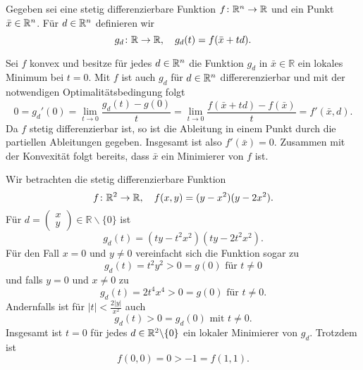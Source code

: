 
Gegeben sei eine stetig differenzierbare Funktion $f\colon \mathbb{R}^n\to\mathbb{R}$ und ein Punkt $\bar x\in\mathbb{R}^n$.
Für $d\in\mathbb{R}^n$ definieren wir
\begin{displaymath}
 g_d\colon \mathbb{R}\to\mathbb{R} , \quad g_d(t)=f(\bar x+td). 
\end{displaymath}
\begin{compactenum}[(i)]
 \item Sei $f$ konvex und besitze für jedes $d\in\mathbb{R}^n$ die Funktion $g_d$ in $\bar x\in\mathbb{R}$ ein lokales Minimum bei $t=0$.
 Mit $f$ ist auch $g_d$ für $d\in \mathbb{R}^n$ differerenzierbar und mit der notwendigen Optimalitätsbedingung folgt
 \begin{displaymath}
  0=g_d'(0)=\lim_{t\to 0} \frac{g_d(t)-g(0)}{t}=\lim_{t\to0}\frac{f(\bar x+td)-f(\bar x)}{t}=f'(\bar x,d).
 \end{displaymath}
 Da $f$ stetig differenzierbar ist, so ist die Ableitung in einem Punkt durch die partiellen Ableitungen gegeben.
 Insgesamt ist also $f'(\bar x)=0$. Zusammen mit der Konvexität folgt bereits, dass $\bar x$ ein Minimierer von $f$ ist.
 \\
 \item Wir betrachten die stetig differenzierbare Funktion
 \begin{displaymath}
 f\colon \mathbb{R}^2\to\mathbb{R},\quad f(x,y)=(y-x^2)(y-2x^2).
 \end{displaymath}
 Für $d=\begin{pmatrix}x\\y\end{pmatrix}\in\mathbb{R}\backslash\{0\}$ ist 
 \begin{displaymath}
  g_d(t)=(ty-t^2x^2)(ty-2t^2x^2).
 \end{displaymath} 
 Für den Fall $x=0$ und $y\neq 0$ vereinfacht sich die Funktion sogar zu
 \begin{displaymath}
  g_d(t)=t^2y^2>0=g(0) \text{ für } t\neq 0
 \end{displaymath}
 und falls $y=0$ und $x\neq 0$ zu
 \begin{displaymath}
   g_d(t)=2t^4x^4>0=g(0) \text{ für } t\neq 0.
 \end{displaymath}
 Andernfalls ist für $|t|<\frac{2|y|}{x^2}$ auch
 \begin{displaymath}
  g_d(t)>0=g_d(0) \text{ mit }t\neq0.
 \end{displaymath}
 Insgesamt ist $t=0$ für jedes $d\in\mathbb{R}^2\backslash\{0\}$ ein lokaler Minimierer von $g_d$.
 Trotzdem ist
 \begin{displaymath}
  f(0,0)=0>-1=f(1,1).
 \end{displaymath}
\end{compactenum}
